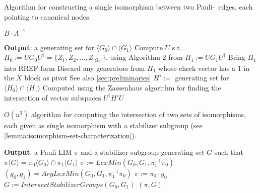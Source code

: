 \begin{algorithm}
    \caption{Algorithm for constructing a single isomorphism between two Pauli-\limdd~edges, each pointing to canonical nodes.
    }
    \label{alg:getsingleisomorphism}
    \begin{algorithmic}[1]
        \State \Return $B \cdot A^{-1}$
        \EndIf
        \State \Return \none
        \EndProcedure
    \end{algorithmic}
\end{algorithm}





\begin{algorithm}
    \caption{
        \label{alg:intersectstabilizergroups}
    }
    \begin{algorithmic}[1]
        \Statex \textbf{Output}: a generating set for $\langle G_0 \rangle \cap \langle G_1 \rangle$
        \State Compute $U$ s.t. $H_0 := U G_0 U^{\dagger} = \{Z_1, Z_2, \dots, Z_{|G_0|}\}$, using Algorithm 2 from \cite{garcia2012efficient}
        \State $H_1 := U G_1 U^{\dagger}$
        \State Bring $H_1$ into RREF form
        \State Discard any generators from $H_1$ whose check vector has a $1$ in the $X$ block as pivot
        \Comment See also \autoref{sec:preliminaries}
        \State $H':=$ generating set for $\langle H_0 \rangle \cap \langle H_1 \rangle$
        \Comment Computed using the Zassenhaus algorithm for finding the intersection of vector subspaces
        \State \Return $U^{\dagger} H' U$ 
        \EndProcedure
    \end{algorithmic}
\end{algorithm}

\begin{algorithm}
    \caption{$O(n^3)$ algorithm for computing the intersection of two sets of isomorphisms, each given as single isomorphism with a stabilizer subgroup (see \autoref{lemma:isomorphism-set-characterization}).
    \label{alg:findisointersection}
    }
    \begin{algorithmic}[1]
        \Statex \textbf{Output}: a Pauli LIM $\pi$ and a stabilizer subgroup generating set $G$ such that $\pi \langle G \rangle = \pi_0 \langle G_0 \rangle \cap \pi_1 \langle G_1 \rangle$
        \State $\pi := LexMin(G_0, G_1, \pi_1^{-1}\pi_0)$
        \If{$\pi = \id$}
        \State $(g_0, g_1) = ArgLexMin(G_0, G_1, \pi_1^{-1}\pi_0)$
        \State $\pi := \pi_0 \cdot g_0$
        \State $G := IntersectStabilizerGroups(G_0,G_1)$
        \State \Return $(\pi, G)$
        \Else
        \State \Return \none
        \EndIf
        \EndProcedure
    \end{algorithmic}
\end{algorithm}



